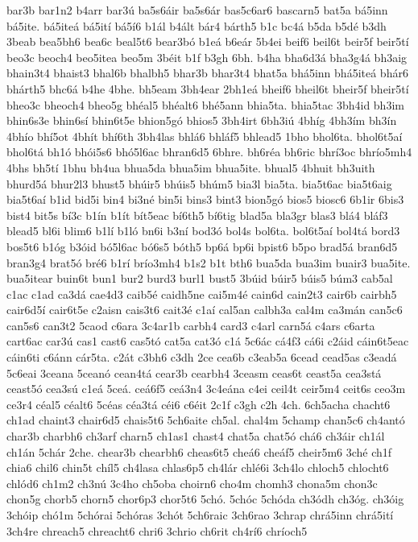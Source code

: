 {bar3b
bar1n2
b4arr
bar3ú
ba5s6áir
ba5s6ár
bas5c6ar6
bascarn5
bat5a
bá5inn
bá5ite.
bá5iteá
bá5ití
bá5í6
b1ál
b4ált
bár4
bárth5
b1c
bc4á
b5da
b5dé
b3dh
3beab
bea5bh6
bea6c
beal5t6
bear3bó
b1eá
b6eár
5b4ei
beif6
beil6t
beir5f
beir5tí
beo3c
beoch4
beo5itea
beo5m
3béit
b1f
b3gh
6bh.
b4ha
bha6d3á
bha3g4á
bh3aig
bhain3t4
bhaist3
bhal6b
bhalbh5
bhar3b
bhar3t4
bhat5a
bhá5inn
bhá5iteá
bhár6
bhárth5
bhc6á
b4he
4bhe.
bh5eam
3bh4ear
2bh1eá
bheif6
bheil6t
bheir5f
bheir5tí
bheo3c
bheoch4
bheo5g
bhéal5
bhéalt6
bhé5ann
bhia5ta.
bhia5tac
3bh4id
bh3im
bhin6s3e
bhin6sí
bhin6t5e
bhion5gó
bhios5
3bh4irt
6bh3iú
4bhíg
4bh3ím
bh3ín
4bhío
bhí5ot
4bhít
bhí6th
3bh4las
bhlá6
bhláf5
bhlead5
1bho
bhol6ta.
bhol6t5aí
bhol6tá
bh1ó
bhói5s6
bhó5l6ac
bhran6d5
6bhre.
bh6réa
bh6ric
bhrí3oc
bhrío5mh4
4bhs
bh5tí
1bhu
bh4ua
bhua5da
bhua5im
bhua5ite.
bhual5
4bhuit
bh3uith
bhurd5á
bhur2l3
bhust5
bhúir5
bhúis5
bhúm5
bia3l
bia5ta.
bia5t6ac
bia5t6aig
bia5t6aí
b1id
bid5i
bin4
bi3né
bin5i
bins3
bint3
bion5gó
bios5
biosc6
6b1ir
6bis3
bist4
bit5s
bí3c
b1ín
b1ít
bít5eac
bí6th5
bí6tig
blad5a
bla3gr
blas3
blá4
bláf3
blead5
bl6i
blim6
b1lí
b1ló
bn6i
b3ní
bod3ó
bol4s
bol6ta.
bol6t5aí
bol4tá
bord3
bos5t6
b1óg
b3óid
bó5l6ac
bó6s5
bóth5
bp6á
bp6i
bpist6
b5po
brad5á
bran6d5
bran3g4
brat5ó
bré6
b1rí
brío3mh4
b1s2
b1t
bth6
bua5da
bua3im
buair3
bua5ite.
bua5itear
buin6t
bun1
bur2
burd3
burl1
bust5
3búid
búir5
búis5
búm3
cab5al
c1ac
c1ad
ca3dá
cae4d3
caib5é
caidh5ne
cai5m4é
cain6d
cain2t3
cair6b
cairbh5
cair6d5í
cair6t5e
c2aisn
cais3t6
cait3é
c1aí
cal5an
calbh3a
cal4m
ca3mán
can5c6
can5s6
can3t2
5caod
c6ara
3c4ar1b
carbh4
card3
c4arl
carn5á
c4ars
c6arta
cart6ac
car3ú
cas1
cast6
cas5tó
cat5a
cat3ó
c1á
5c6ác
cá4f3
cá6i
c2áid
cáin6t5eac
cáin6ti
c6ánn
cár5ta.
c2át
c3bh6
c3dh
2ce
cea6b
c3eab5a
6cead
cead5as
c3eadá
5c6eai
3ceana
5ceanó
cean4tá
cear3b
cearbh4
3ceasm
ceas6t
ceast5a
cea3stá
ceast5ó
cea3sú
c1eá
5ceá.
ceá6f5
ceá3n4
3c4eána
c4ei
ceil4t
ceir5m4
ceit6s
ceo3m
ce3r4
céal5
céalt6
5céas
céa3tá
céi6
c6éit
2c1f
c3gh
c2h
4ch.
6ch5acha
chacht6
ch1ad
chaint3
chair6d5
chais5t6
5ch6aite
ch5al.
chal4m
5champ
chan5c6
ch4antó
char3b
charbh6
ch3arf
charn5
ch1as1
chast4
chat5a
chat5ó
chá6
ch3áir
ch1ál
ch1án
5chár
2che.
chear3b
chearbh6
cheas6t5
cheá6
cheáf5
cheir5m6
3ché
ch1f
chia6
chil6
chin5t
chíl5
ch4lasa
chlas6p5
ch4lár
chlé6i
3ch4lo
chloch5
chlocht6
chlód6
ch1m2
ch3nú
3c4ho
ch5oba
choirn6
cho4m
chomh3
chona5m
chon3c
chon5g
chorb5
chorn5
chor6p3
chor5t6
5chó.
5chóc
5chóda
ch3ódh
ch3óg.
ch3óig
3chóip
chó1m
5chórai
5chóras
3chót
5ch6raic
3ch6rao
3chrap
chrá5inn
chrá5ití
3ch4re
chreach5
chreacht6
chri6
3chrio
ch6rit
ch4rí6
chríoch5
}
